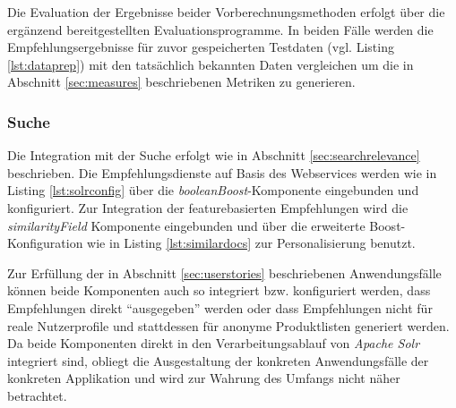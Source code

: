 Die Evaluation der Ergebnisse beider Vorberechnungsmethoden erfolgt über die ergänzend bereitgestellten Evaluationsprogramme. In beiden Fälle werden die Empfehlungsergebnisse für zuvor gespeicherten Testdaten (vgl. Listing \ref{lst:dataprep}) mit den tatsächlich bekannten Daten vergleichen um die in Abschnitt \ref{sec:measures} beschriebenen Metriken zu generieren.

\subsubsection{Suche}

Die Integration mit der Suche erfolgt wie in Abschnitt \ref{sec:searchrelevance} beschrieben. Die Empfehlungsdienste auf Basis des Webservices werden wie in Listing \ref{lst:solrconfig} über die \textit{booleanBoost}-Komponente eingebunden und konfiguriert. Zur Integration der featurebasierten Empfehlungen wird die \textit{similarityField} Komponente eingebunden und über die erweiterte Boost-Konfiguration wie in Listing \ref{lst:similardocs}  zur Personalisierung benutzt.

Zur Erfüllung der in Abschnitt \ref{sec:userstories} beschriebenen Anwendungsfälle können beide Komponenten auch so integriert bzw. konfiguriert werden, dass Empfehlungen direkt ``ausgegeben'' werden oder dass Empfehlungen nicht für reale Nutzerprofile und stattdessen für anonyme Produktlisten generiert werden. Da beide Komponenten direkt in den Verarbeitungsablauf von \textit{Apache Solr} integriert sind, obliegt die Ausgestaltung der konkreten Anwendungsfälle der konkreten Applikation und wird zur Wahrung des Umfangs nicht näher betrachtet.

